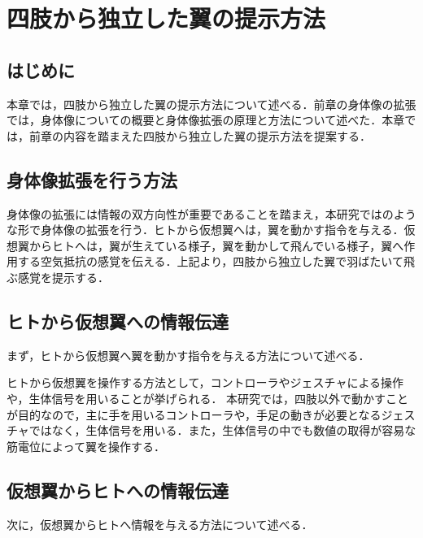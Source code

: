 \chapter[四肢から独立した翼の提示方法]%
        {四肢から独立した翼の提示方法}

\section{はじめに}
    本章では，四肢から独立した翼の提示方法について述べる．前章の身体像の拡張では，身体像についての概要と身体像拡張の原理と方法について述べた．本章では，前章の内容を踏まえた四肢から独立した翼の提示方法を提案する．


\section{身体像拡張を行う方法}
    身体像の拡張には情報の双方向性が重要であることを踏まえ，本研究ではのような形で身体像の拡張を行う．ヒトから仮想翼へは，翼を動かす指令を与える．仮想翼からヒトへは，翼が生えている様子，翼を動かして飛んでいる様子，翼へ作用する空気抵抗の感覚を伝える．上記より，四肢から独立した翼で羽ばたいて飛ぶ感覚を提示する．
    
\section{ヒトから仮想翼への情報伝達}
    まず，ヒトから仮想翼へ翼を動かす指令を与える方法について述べる．

    ヒトから仮想翼を操作する方法として，コントローラやジェスチャによる操作や，生体信号を用いることが挙げられる．
    本研究では，四肢以外で動かすことが目的なので，主に手を用いるコントローラや，手足の動きが必要となるジェスチャではなく，生体信号を用いる．また，生体信号の中でも数値の取得が容易な筋電位によって翼を操作する．




\section{仮想翼からヒトへの情報伝達}
    次に，仮想翼からヒトへ情報を与える方法について述べる．

